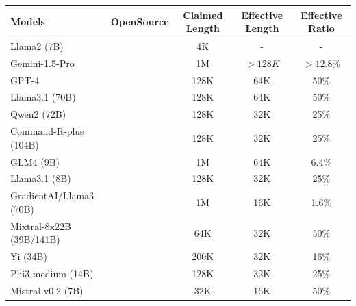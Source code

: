 \documentclass[11pt, a4paper, logo, copyright, nonumbering]{map}
\newcommand{\Checkmark}{\ding{51}} %
\newcommand{\XSolidBrush}{\ding{55}} %
\begin{document}
\begin{table}[!htp]
\centering
\footnotesize
\begin{tabular}{@{}lcccc@{}}
\toprule
\textbf{Models}               & \textbf{OpenSource}       & \textbf{Claimed Length} & \textbf{Effective Length} & \textbf{Effective Ratio} \\ \midrule
Llama2 (7B)                   & \Checkmark                    & 4K                     & -                          & -                     \\
Gemini-1.5-Pro                & \XSolidBrush                    & 1M                     & $>128K$                    & $>12.8\%$                      \\
GPT-4                         & \XSolidBrush                    & 128K                   & 64K                        & 50\%                     \\
Llama3.1 (70B)                & \Checkmark                    & 128K                   & 64K                        & 50\%                     \\
Qwen2 (72B)                   & \Checkmark                    & 128K                   & 32K                        & 25\%                      \\
Command-R-plus (104B)         & \Checkmark                    & 128K                   & 32K                        & 25\%                     \\
GLM4 (9B)                     & \Checkmark                    & 1M                     & 64K                        & 6.4\%                     \\
Llama3.1 (8B)                 & \Checkmark                    & 128K                   & 32K                        & 25\%                     \\
GradientAI/Llama3 (70B)       & \Checkmark                    & 1M                     & 16K                        & 1.6\%                     \\
Mixtral-8x22B (39B/141B)      & \Checkmark                    & 64K                    & 32K                        & 50\%                     \\
Yi (34B)                      & \Checkmark                    & 200K                   & 32K                        & 16\%                     \\
Phi3-medium (14B)             & \Checkmark                    & 128K                   & 32K                        & 25\%                     \\
Mistral-v0.2 (7B)             & \Checkmark                    & 32K                    & 16K                        & 50\%                     \\

\end{tabular}
\end{table}
\end{document}
